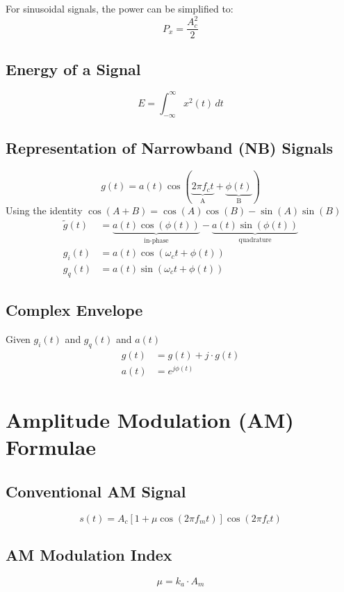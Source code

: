 \documentclass[12pt]{article}
\begin{document}
For sinusoidal signals, the power can be simplified to:
$$
	P_x = \frac{A_c^2}{2}
$$

\subsection{Energy of a Signal}
$$
	E = \int_{-\infty}^{\infty} x^2(t) \, dt
$$

\subsection{Representation of Narrowband (NB) Signals}
$$
	g(t) = a(t) \cos(\underbrace{2 \pi f_c t}_{\text{A}} + \underbrace{\phi(t)}_{\text{B}})
$$
Using the identity $\cos(A+B) = \cos(A)\cos(B) - \sin(A)\sin(B)$
\begin{align*}
	\tilde{g}(t) & = \underbrace{a(t) \cos(\phi(t))}_{\text{in-phase}} - \underbrace{a(t) \sin(\phi(t))}_{\text{quadrature}} \\
	g_i(t)       & = a(t) \cos(\omega_c t + \phi(t))                                                                         \\
	g_q(t)       & = a(t) \sin(\omega_c t + \phi(t))
\end{align*}

\subsection{Complex Envelope}
Given $g_i(t)$ and $g_q(t)$ and $a(t)$
\begin{align*}
	g(t) & = g(t) + j \cdot g(t) \\
	a(t) & = e^{j\phi(t)}
\end{align*}

\section{Amplitude Modulation (AM) Formulae}
\subsection{Conventional AM Signal}
\[
	s(t) = A_c\left[1 + \mu\cos(2 \pi f_m t)\right]\cos(2 \pi f_c t)
\]

\subsection{AM Modulation Index}

$$
	\mu = k_a \cdot A_m
$$
\end{document}
